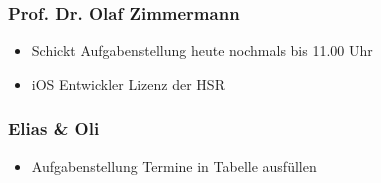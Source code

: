 \hypertarget{prof-dr-olaf-zimmermann}{%
\subsubsection*{Prof. Dr. Olaf Zimmermann}\label{prof-dr-olaf-zimmermann}}

\begin{itemize}

\item
  Schickt Aufgabenstellung heute nochmals bis 11.00 Uhr
\item
  iOS Entwickler Lizenz der HSR
\end{itemize}

\hypertarget{elias--oli}{%
\subsubsection*{Elias \& Oli}\label{elias--oli}}

\begin{itemize}

\item
  Aufgabenstellung Termine in Tabelle ausfüllen
\end{itemize}